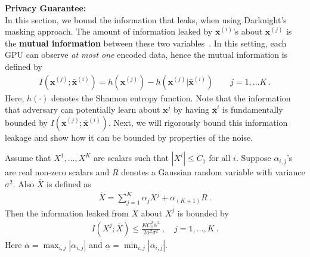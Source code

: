 \textbf{Privacy Guarantee:}\\ 
In this section, we bound the information that leaks, when using Darknight's masking approach. The amount of information leaked by $\bar{\mathbf x}^{(i)}$'s about $\mathbf x^{(j)}$ is the \textbf{mutual information} between these two variables~\citep{cover1999elements}. In this setting, each GPU can observe \emph{at most one} encoded data, hence the mutual information is defined by
\begin{align}
    I(\mathbf x^{(j)} ; \bar{\mathbf x}^{(i)})= h(\mathbf x^{(j)})-h(\mathbf x^{(j)} |\bar{\mathbf x}^{(i)})\qquad j=1,\dots K~.
\end{align}
Here, $ h(\cdot)$ denotes the Shannon entropy function. Note that the information that adversary can potentially learn about $\mathbf x^j$ by having $\bar{\mathbf x}^i$ is fundamentally bounded by  $I(\mathbf x^{(j)} ; \bar{\mathbf x}^{(i)})$. Next, we will rigorously bound this information leakage and show how it can be bounded by properties of the noise.
\begin{thm}\label{thm:info_leakage}
Assume that $X^1,\dots,X^K$ are scalars such that $|X^i|\leq C_1$ for all $i$. Suppose $\alpha_{i,j}$'s are real non-zero scalars and $R$ denotes a Gaussian random variable with variance $\sigma^2$. Also $\bar X$ is defined as
\begin{align}
    \bar X=\sum_{j=1}^K \alpha_{j} X^j + \alpha_{(K+1)} R~.
\end{align}
Then the information leaked from $\bar X$ about $X^j$ is bounded by
\begin{align}\label{eq:infor_bound1}
    I\left(X^j ; \bar X\right)\leq \frac{K C_1^2\bar\alpha^2}{2\underset{\bar{}}{\alpha}^2\sigma^2}~,\quad j=1,\dots, K~.
\end{align}
Here $\bar\alpha=\max_{i,j}|{\alpha_{i,j}}|$ and $\underset{\bar{}}{\alpha}=\min_{i,j}| \alpha_{i,j}|$.
\end{thm}
